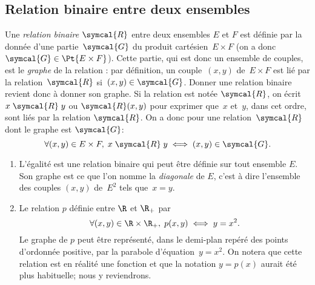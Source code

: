 \subsection{Relation binaire entre deux ensembles}\label{relbin}
Une \emph{relation binaire} $\symcal{R}$ entre deux ensembles $E$ et $F$ est définie par la donnée d'une partie~$\symcal{G}$ du produit cartésien~$E\times F$ (on a donc $\symcal{G}\in\Pt{E\times F}$). Cette partie, qui est donc un ensemble de couples, est le \emph{graphe} de la relation : par définition, un couple~$(x,y)$ de~$E\times F$ est lié par la relation~$\symcal{R}$ si~$(x,y)\in \symcal{G}$. Donner une relation binaire revient donc à donner son graphe. Si la relation est notée $\symcal{R}$, on écrit $x\mathrel{\symcal{R}}y$ ou $\symcal{R}(x,y)$ pour exprimer que~$x$ et~$y$, dans cet ordre, sont liés par la relation $\symcal{R}$. On a donc pour une relation~$\symcal{R}$ dont le graphe est $\symcal{G}$:
\[\forall (x,y)\in E\times F, \; x\mathrel{\symcal{R}}y\iff(x,y)\in \symcal{G}.\]

\begin{example}[Exemples]
\begin{enumerate}
\item L'égalité est une relation binaire qui peut être définie sur tout ensemble $E$. Son graphe est ce que l'on nomme la \emph{diagonale} de $E$, c'est à dire l'ensemble des couples $(x,y)$ de~$E^2$ tels que~$x=y$.


\item Le relation $p$ définie entre $\R$ et $\R_+$ par 
\[\forall (x,y)\in \R\times \R_+,\; p(x,y)\iff y=x^2.\]
Le graphe de $p$ peut être représenté, dans le demi-plan repéré des points d'ordonnée positive, par la parabole d'équation~$y=x^2$. On notera que cette relation est en réalité une fonction et que la notation $y=p(x)$ aurait été plus habituelle; nous y reviendrons. 
\end{enumerate}
\end{example}

